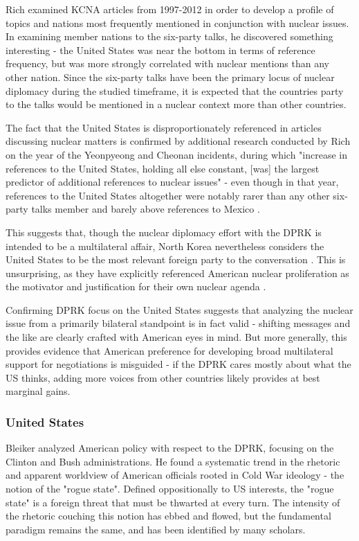 \documentclass{article}
\begin{document}
Rich \cite{rich14} examined KCNA articles from 1997-2012 in order to develop a profile of topics and nations most frequently mentioned in conjunction with nuclear issues. In examining member nations to the six-party talks, he discovered something interesting -  the United States was near the bottom in terms of reference frequency, but was more strongly correlated with nuclear mentions than any other nation. Since the six-party talks have been the primary locus of nuclear diplomacy during the studied timeframe, it is expected that the countries party to the talks would be mentioned in a nuclear context more than other countries.

The fact that the United States is disproportionately referenced in articles discussing nuclear matters is confirmed by additional research conducted by Rich on the year of the Yeonpyeong and Cheonan incidents, during which "increase in references to the United States, holding all else constant, [was] the largest predictor of additional references to nuclear issues" - even though in that year, references to the United States altogether were notably rarer than any other six-party talks member and barely above references to Mexico \cite{rich12}.

This suggests that, though the nuclear diplomacy effort with the DPRK is intended to be a multilateral affair, North Korea nevertheless considers the United States to be the most relevant foreign party to the conversation \cite{rich14}. This is unsurprising, as they have explicitly referenced American nuclear proliferation as the motivator and justification for their own nuclear agenda \cite{kcna, kcna3, kcna4}.

Confirming DPRK focus on the United States suggests that analyzing the nuclear issue from a primarily bilateral standpoint is in fact valid - shifting messages and the like are clearly crafted with American eyes in mind. But more generally, this provides evidence that American preference for developing broad multilateral support for negotiations is misguided - if the DPRK cares mostly about what the US thinks, adding more voices from other countries likely provides at best marginal gains.

\subsubsection{United States}

Bleiker \cite{bleiker} analyzed American policy with respect to the DPRK, focusing on the Clinton and Bush administrations. He found a systematic trend in the rhetoric and apparent worldview of American officials rooted in Cold War ideology - the notion of the "rogue state". Defined oppositionally to US interests, the "rogue state" is a foreign threat that must be thwarted at every turn. The intensity of the rhetoric couching this notion has ebbed and flowed, but the fundamental paradigm remains the same, and has been identified by many scholars\cite{bleiker,smith,sigal,cumings}.
\end{document}
